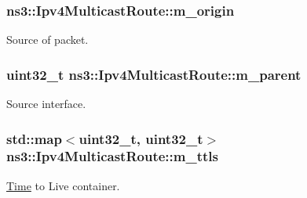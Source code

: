 \subsubsection[{\texorpdfstring{m\+\_\+origin}{m_origin}}]{ ns3\+::\+Ipv4\+Multicast\+Route\+::m\+\_\+origin\hspace{0.3cm}{\ttfamily [private]}}\hypertarget{classns3_1_1Ipv4MulticastRoute_a86aaae8111723a94b51f3bbff7bb16d1}{}\label{classns3_1_1Ipv4MulticastRoute_a86aaae8111723a94b51f3bbff7bb16d1}


Source of packet. 

\subsubsection[{\texorpdfstring{m\+\_\+parent}{m_parent}}]{\setlength{\rightskip}{0pt plus 5cm}uint32\+\_\+t ns3\+::\+Ipv4\+Multicast\+Route\+::m\+\_\+parent\hspace{0.3cm}{\ttfamily [private]}}\hypertarget{classns3_1_1Ipv4MulticastRoute_a9cda8824d64903a9b43675d008285499}{}\label{classns3_1_1Ipv4MulticastRoute_a9cda8824d64903a9b43675d008285499}


Source interface. 

\subsubsection[{\texorpdfstring{m\+\_\+ttls}{m_ttls}}]{\setlength{\rightskip}{0pt plus 5cm}std\+::map$<$uint32\+\_\+t, uint32\+\_\+t$>$ ns3\+::\+Ipv4\+Multicast\+Route\+::m\+\_\+ttls\hspace{0.3cm}{\ttfamily [private]}}\hypertarget{classns3_1_1Ipv4MulticastRoute_ac56c7c5c768e34463652476f262b8b70}{}\label{classns3_1_1Ipv4MulticastRoute_ac56c7c5c768e34463652476f262b8b70}


\hyperlink{classns3_1_1Time}{Time} to Live container. 


